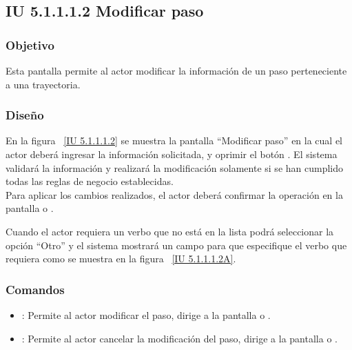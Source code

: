 \subsection{IU 5.1.1.1.2 Modificar paso}

\subsubsection{Objetivo}
	
	Esta pantalla permite al actor modificar la información de un paso perteneciente a una trayectoria.

\subsubsection{Diseño}

    En la figura ~\ref{IU 5.1.1.1.2} se muestra la pantalla ``Modificar paso'' en la cual el actor deberá ingresar la información solicitada, y oprimir el botón . El sistema validará la información y realizará la modificación solamente si se han cumplido todas las reglas de negocio establecidas.\\
	
	Para aplicar los cambios realizados, el actor deberá confirmar la operación en la pantalla  o .
    
    Cuando el actor requiera un verbo que no está en la lista podrá seleccionar la opción ``Otro'' y el sistema mostrará un campo para que especifique el verbo que requiera como se muestra en la figura ~\ref{IU 5.1.1.1.2A}. \\
    




\subsubsection{Comandos}
\begin{itemize}
	\item {}: Permite al actor modificar el paso, dirige a la pantalla  o .
	\item {}: Permite al actor cancelar la modificación del paso, dirige a la pantalla  o .
\end{itemize}

